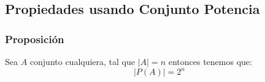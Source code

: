 \documentclass[12pt]{report}                                    %
\begin{document}
        \subsection{Propiedades usando Conjunto Potencia}

            \subsubsection{Proposición}
                Sea $A$ conjunto cualquiera, tal que $|A| = n$ entonces tenemos que:
                \begin{equation*}
                    |P(A)| = 2^n
                \end{equation*}
\end{document}
